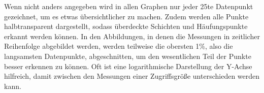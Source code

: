 \documentclass[
	twoside,
	12pt,
	a4paper,
	BCOR10mm,
	DIV14,
	listof=totoc,
	bibliography=totoc,
	headsepline
]{scrreprt}
\begin{document}
Wenn nicht anders angegeben wird in allen Graphen nur jeder 25te Datenpunkt gezeichnet, um es etwas übersichtlicher zu machen.
Zudem werden alle Punkte halbtransparent dargestellt, sodass überdeckte Schichten und Häufungspunkte erkannt werden können.
In den Abbildungen, in denen die Messungen in zeitlicher Reihenfolge abgebildet werden, werden teilweise die obersten 1\%, also die langsamsten Datenpunkte, abgeschnitten, um den wesentlichen Teil der Punkte besser erkennen zu können.
Oft ist eine logarithmische Darstellung der Y-Achse hilfreich, damit zwischen den Messungen einer Zugriffsgröße unterschieden werden kann. 
\begin{figure}
	\hfill
	\\
	\hfill
\end{figure}
\end{document}
